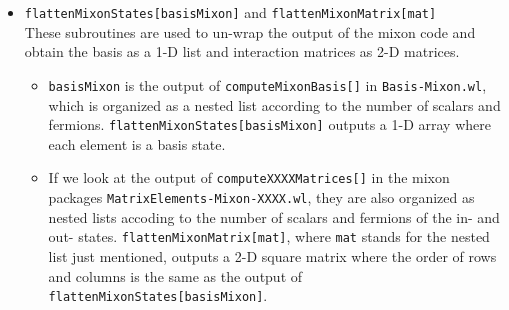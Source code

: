 \documentclass[12pt]{article}
\begin{document}
\begin{itemize}
\item {\tt flattenMixonStates[basisMixon]} and {\tt flattenMixonMatrix[mat]}\\
These subroutines are used to un-wrap the output of the mixon code and obtain the basis as a 1-D list and interaction matrices as 2-D matrices.  
\begin{itemize}
\item {\tt basisMixon} is the output of {\tt computeMixonBasis[]} in {\tt Basis-Mixon.wl}, which is organized as a nested list according to the number of scalars and fermions. {\tt flattenMixonStates[basisMixon]} outputs a 1-D array where each element is a basis state. 
\item If we look at the output of {\tt computeXXXXMatrices[]} in the mixon packages {\tt MatrixElements-Mixon-XXXX.wl}, they are also organized as nested lists accoding to the number of scalars and fermions of the in- and out- states. {\tt flattenMixonMatrix[mat]}, where {\tt mat} stands for the nested list just mentioned, outputs a 2-D square matrix where the order of rows and columns is the same as the output of {\tt flattenMixonStates[basisMixon]}.
\end{itemize}

\end{itemize}
\end{document}
